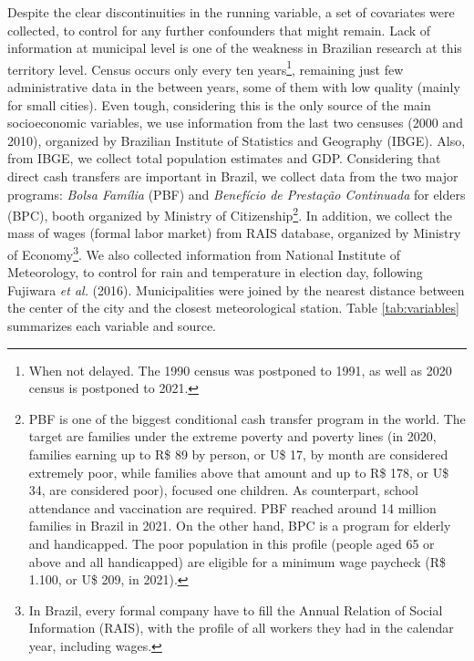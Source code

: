 \documentclass[
  12pt,
]{article}
\begin{document}
Despite the clear discontinuities in the running variable, a set of
covariates were collected, to control for any further confounders that
might remain. Lack of information at municipal level is one of the
weakness in Brazilian research at this territory level. Census occurs
only every ten years\footnote{When not delayed. The 1990 census was
  postponed to 1991, as well as 2020 census is postponed to 2021.},
remaining just few administrative data in the between years, some of
them with low quality (mainly for small cities). Even tough, considering
this is the only source of the main socioeconomic variables, we use
information from the last two censuses (2000 and 2010), organized by
Brazilian Institute of Statistics and Geography (IBGE). Also, from IBGE,
we collect total population estimates and GDP. Considering that direct
cash transfers are important in Brazil, we collect data from the two
major programs: \emph{Bolsa Família} (PBF) and \emph{Benefício de
Prestação Continuada} for elders (BPC), booth organized by Ministry of
Citizenship\footnote{PBF is one of the biggest conditional cash transfer
  program in the world. The target are families under the extreme
  poverty and poverty lines (in 2020, families earning up to R\$ 89 by
  person, or U\$ 17, by month are considered extremely poor, while
  families above that amount and up to R\$ 178, or U\$ 34, are
  considered poor), focused one children. As counterpart, school
  attendance and vaccination are required. PBF reached around 14 million
  families in Brazil in 2021. On the other hand, BPC is a program for
  elderly and handicapped. The poor population in this profile (people
  aged 65 or above and all handicapped) are eligible for a minimum wage
  paycheck (R\$ 1.100, or U\$ 209, in 2021).}. In addition, we collect
the mass of wages (formal labor market) from RAIS database, organized by
Ministry of Economy\footnote{In Brazil, every formal company have to
  fill the Annual Relation of Social Information (RAIS), with the
  profile of all workers they had in the calendar year, including wages.}.
We also collected information from National Institute of Meteorology, to
control for rain and temperature in election day, following Fujiwara
\emph{et al.} (2016). Municipalities were joined by the nearest distance
between the center of the city and the closest meteorological station.
Table \ref{tab:variables} summarizes each variable and source.
\end{document}
